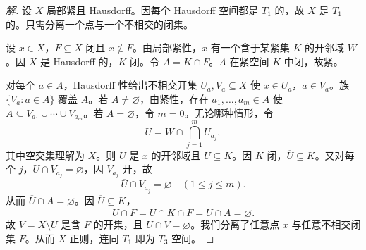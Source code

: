 \documentclass[11pt,a4paper]{article}
\theoremstyle{definition}
\newenvironment{solution}{\begin{proof}[解]}{\end{proof}}
\begin{document}
\begin{solution}
设 $X$ 局部紧且 Hausdorff。因每个 Hausdorff 空间都是 $T_1$ 的，故 $X$ 是 $T_1$ 的。只需分离一个点与一个不相交的闭集。

设 $x \in X$，$F \subseteq X$ 闭且 $x \notin F$。由局部紧性，$x$ 有一个含于某紧集 $K$ 的开邻域 $W$。因 $X$ 是 Hausdorff 的，$K$ 闭。令 $A = K \cap F$。$A$ 在紧空间 $K$ 中闭，故紧。

对每个 $a \in A$，Hausdorff 性给出不相交开集 $U_a, V_a \subseteq X$ 使 $x \in U_a$，$a \in V_a$。族 $\{V_a : a \in A\}$ 覆盖 $A$。若 $A \ne \varnothing$，由紧性，存在 $a_1, \dots, a_m \in A$ 使 $A \subseteq V_{a_1} \cup \cdots \cup V_{a_m}$。若 $A = \varnothing$，令 $m = 0$。无论哪种情形，令
\[
  U = W \cap \bigcap_{j=1}^m U_{a_j},
\]
其中空交集理解为 $X$。则 $U$ 是 $x$ 的开邻域且 $U \subseteq K$。因 $K$ 闭，$\overline{U} \subseteq K$。又对每个 $j$，$U \cap V_{a_j} = \varnothing$，因 $V_{a_j}$ 开，故
\[
  \overline{U} \cap V_{a_j} = \varnothing \quad (1 \le j \le m).
\]
从而 $\overline{U} \cap A = \varnothing$。因 $\overline{U} \subseteq K$，
\[
  \overline{U} \cap F = \overline{U} \cap K \cap F = \overline{U} \cap A = \varnothing.
\]
故 $V = X \setminus \overline{U}$ 是含 $F$ 的开集，且 $U \cap V = \varnothing$。我们分离了任意点 $x$ 与任意不相交闭集 $F$。从而 $X$ 正则，连同 $T_1$ 即为 $T_3$ 空间。
\end{solution}
\end{document}
